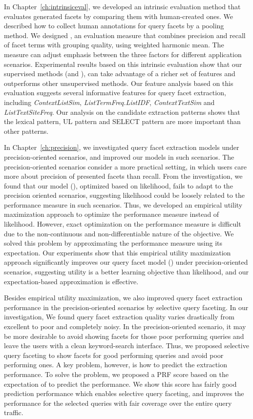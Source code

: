 In Chapter~\ref{ch:intrinsiceval}, we developed an intrinsic evaluation method that evaluates generated facets by comparing them with human-created ones. We described how to collect human annotations for query facets by a pooling method. We designed \PRF, an evaluation measure that combines precision and recall of facet terms with grouping quality, using weighted harmonic mean. The measure can adjust emphasis between the three factors for different application scenarios. Experimental results based on this intrinsic evaluation show that our supervised methods (\QFI and \QFJ), can take advantage of a richer set of features and outperforms other unsupervised methods. Our feature analysis based on this evaluation suggests several informative features for query facet extraction, including \textit{ContextListSim}, \textit{ListTermFreq.ListIDF}, \textit{ContextTextSim} and \textit{ListTextSiteFreq}. Our analysis on the candidate extraction patterns shows that the lexical pattern, UL pattern and SELECT pattern are more important than other patterns.

In Chapter~\ref{ch:precision}, we investigated query facet extraction models under precision-oriented scenarios, and improved our models in such scenarios. 
The precision-oriented scenarios consider a more practical setting, in which users care more about precision of presented facets than recall. From the investigation, we found that our model (\QFJ), optimized based on likelihood, fails to adapt to the precision oriented scenarios, suggesting likelihood could be loosely related to the performance measure in such scenarios.
Thus, we developed an empirical utility maximization approach to optimize the performance measure instead of likelihood. However, exact optimization on the performance measure is difficult due to the non-continuous and non-differentiable nature of the objective. We solved this problem by approximating the performance measure using its expectation. 
Our experiments show that this empirical utility maximization approach significantly improves our query facet model (\QFJ) under precision-oriented scenarios, suggesting utility is a better learning objective than likelihood, and our expectation-based approximation is effective. 
 
Besides empirical utility maximization, we also improved query facet extraction performance in the precision-oriented scenarios by selective query faceting. In our investigation, We found query facet extraction quality varies drastically from excellent to poor and completely noisy. In the precision-oriented scenario, it may be more desirable to avoid showing facets for those poor performing queries and leave the users with a clean keyword-search interface. Thus, we proposed selective query faceting to show facets for good performing queries and avoid poor performing ones. A key problem, however, is how to predict the extraction performance. To solve the problem, we proposed a PRF score based on the expectation of \PRF to predict the performance. We show this score has fairly good prediction performance which enables selective query faceting, and improves the performance for the selected queries with fair coverage over the entire query traffic.


